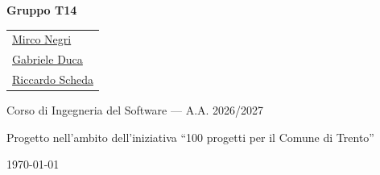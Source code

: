 \documentclass[12pt, a4paper]{article}
\newcommand{\myfootertext}{}
\renewcommand{\arraystretch}{1.2}
\begin{document}
\begin{titlepage}
    \vspace{0.3cm}

    \begin{flushleft}
        {\Large \textbf{Gruppo T14} \par}
        \vspace{0.3cm}
        \renewcommand{\arraystretch}{1.3}
        \begin{tabular}{@{}l}
            \Large \href{https://github.com/mirconegri}{Mirco Negri} \\
            \Large \href{https://github.com/ghebbb}{Gabriele Duca} \\
            \Large \href{https://github.com/scheddiee}{Riccardo Scheda} \\
        \end{tabular}
    \end{flushleft}

    \vfill

    \begin{flushleft}
        {\small Corso di Ingegneria del Software --- A.A. 2026/2027 \par}
        {\small Progetto nell'ambito dell'iniziativa ``100 progetti per il Comune di Trento'' \par}
        \vspace{0.2cm}
        {\small\textit{\myfootertext} \par}
        {\large \today \par}
    \end{flushleft}
\end{titlepage}

\newpage
\begingroup
\hypersetup{hidelinks}
\tableofcontents
\endgroup

\newpage










\end{document}
